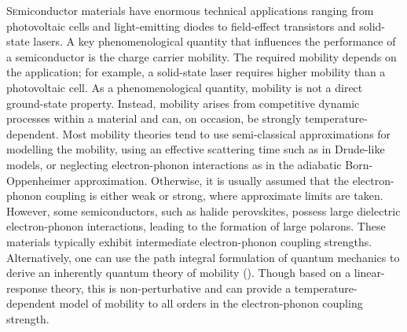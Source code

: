\lettrine{S}emiconductor materials have enormous technical applications ranging from photovoltaic cells and light-emitting diodes to field-effect transistors and solid-state lasers. A key phenomenological quantity that influences the performance of a semiconductor is the charge carrier mobility. The required mobility depends on the application; for example, a solid-state laser requires higher mobility than a photovoltaic cell. As a phenomenological quantity, mobility is not a direct ground-state property. Instead, mobility arises from competitive dynamic processes within a material and can, on occasion, be strongly temperature-dependent. Most mobility theories tend to use semi-classical approximations for modelling the mobility, using an effective scattering time such as in Drude-like models, or neglecting electron-phonon interactions as in the adiabatic Born-Oppenheimer approximation. Otherwise, it is usually assumed that the electron-phonon coupling is either weak or strong, where approximate limits are taken. However, some semiconductors, such as halide perovskites, possess large dielectric electron-phonon interactions, leading to the formation of large polarons. These materials typically exhibit intermediate electron-phonon coupling strengths. Alternatively, one can use the path integral formulation of quantum mechanics to derive an inherently quantum theory of mobility (\cite{feynman_slow_1955, feynman_mobility_1962}). Though based on a linear-response theory, this is non-perturbative and can provide a temperature-dependent model of mobility to all orders in the electron-phonon coupling strength.